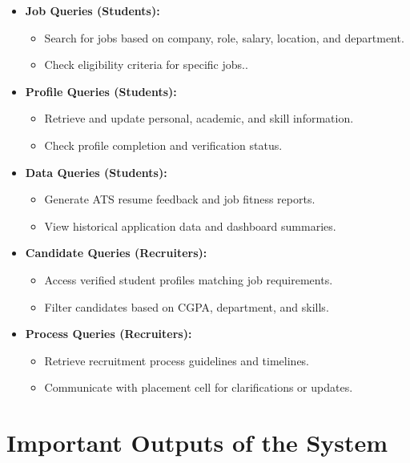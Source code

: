 \documentclass[14pt]{extarticle}
\begin{document}
\begin{itemize}
    \item \textbf{Job Queries (Students):} 
    \begin{itemize}
        \item Search for jobs based on company, role, salary, location, and department.
        \item Check eligibility criteria for specific jobs..
    \end{itemize}
    
    \item \textbf{Profile Queries (Students):} 
    \begin{itemize}
        \item Retrieve and update personal, academic, and skill information.
        \item Check profile completion and verification status.
    \end{itemize}
    
    \item \textbf{Data Queries (Students):} 
    \begin{itemize}
        \item Generate ATS resume feedback and job fitness reports.
        \item View historical application data and dashboard summaries.
    \end{itemize}
    
    \item \textbf{Candidate Queries (Recruiters):} 
    \begin{itemize}
        \item Access verified student profiles matching job requirements.
        \item Filter candidates based on CGPA, department, and skills.
    \end{itemize}
    
    \item \textbf{Process Queries (Recruiters):} 
    \begin{itemize}
        \item Retrieve recruitment process guidelines and timelines.
        \item Communicate with placement cell for clarifications or updates.
    \end{itemize}
    
   
\end{itemize}

\section{Important Outputs of the System}
\end{document}
